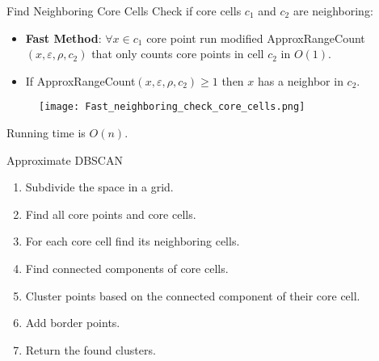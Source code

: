 \documentclass[aspectratio=169]{beamer}
\renewcommand{\epsilon}{\varepsilon}
\begin{document}
\begin{frame}{Find Neighboring Core Cells}
    Check if core cells $c_1$ and $c_2$ are neighboring:
    \begin{itemize}
        \item \textbf{Fast Method}: $\forall x\in c_1$ core point run modified ApproxRangeCount$(x,\epsilon,\rho, c_2)$ that only counts core points in cell $c_2$ in $O(1)$.
        \item If ApproxRangeCount$(x,\epsilon,\rho, c_2)\ge 1$ then $x$ has a neighbor in $c_2$.
    \end{itemize}

    \begin{figure}
        \centering
        \texttt{[image: Fast\_neighboring\_check\_core\_cells.png]}
    \end{figure}

    Running time is $O(n)$.
    
\end{frame}

\begin{frame}{Approximate DBSCAN}
    \begin{enumerate}
        \item Subdivide the space in a grid.
        \item Find all core points and core cells.
        \item For each core cell find its neighboring cells.
        \item Find connected components of core cells.
        \item Cluster points based on the connected component of their core cell.
        \item Add border points.
        \item Return the found clusters.
    \end{enumerate}
\end{frame}
\end{document}

